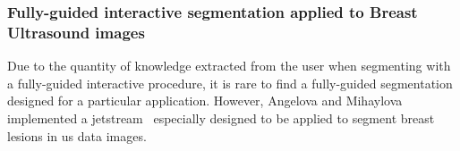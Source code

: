\documentclass[authoryear,preprint,review,12pt]{elsarticle}
\begin{document}

%
%

\subsubsection{Fully-guided interactive segmentation applied to Breast Ultrasound images}

Due to the quantity of knowledge extracted from the user when segmenting with a fully-guided interactive procedure, it is rare to find a fully-guided segmentation designed for a particular application. However, Angelova and Mihaylova~\cite{Angelova:2010p14355,Angelova:2009p14781} implemented a jetstream~\cite{perez2001jetstream} especially designed to be applied to segment breast lesions in \ac{us} data images. 
\end{document}
